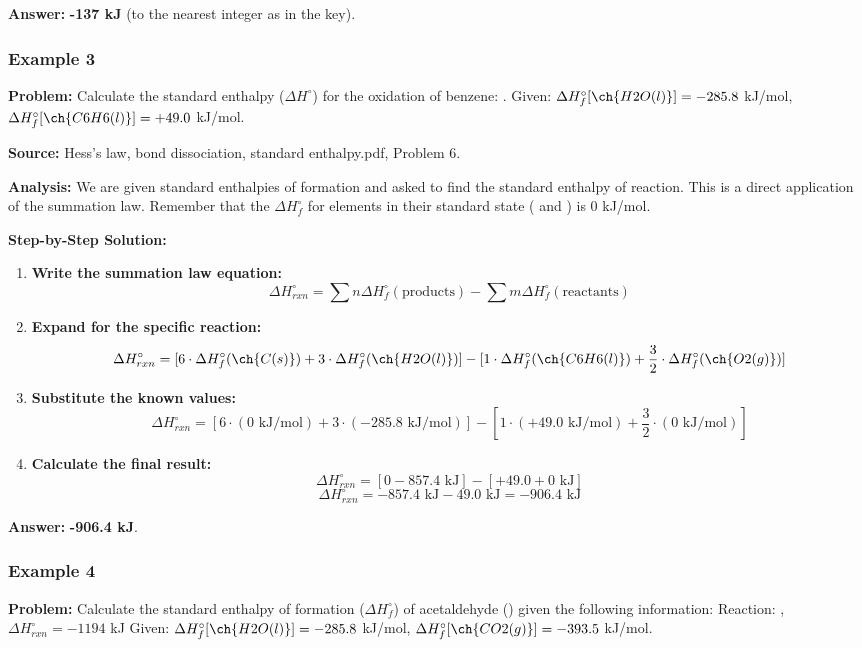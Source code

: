 \documentclass{article}
\begin{document}
\textbf{Answer:} \textbf{-137 kJ} (to the nearest integer as in the key).

\subsubsection{Example 3}
\textbf{Problem:} Calculate the standard enthalpy ($\Delta H^\circ$) for the oxidation of benzene: .
Given: $\Delta H_f^\circ[\ch{H2O(l)}] = -285.8$ kJ/mol, $\Delta H_f^\circ[\ch{C6H6(l)}] = +49.0$ kJ/mol.

\textbf{Source:} Hess's law, bond dissociation, standard enthalpy.pdf, Problem 6.

\textbf{Analysis:} We are given standard enthalpies of formation and asked to find the standard enthalpy of reaction. This is a direct application of the summation law. Remember that the $\Delta H_f^\circ$ for elements in their standard state ( and ) is 0 kJ/mol.

\textbf{Step-by-Step Solution:}
\begin{enumerate}
    \item \textbf{Write the summation law equation:}
    \[ \Delta H_{rxn}^\circ = \sum n\Delta H_f^\circ(\text{products}) - \sum m\Delta H_f^\circ(\text{reactants}) \]
    \item \textbf{Expand for the specific reaction:}
    \[ \Delta H_{rxn}^\circ = [6 \cdot \Delta H_f^\circ(\ch{C(s)}) + 3 \cdot \Delta H_f^\circ(\ch{H2O(l)})] - [1 \cdot \Delta H_f^\circ(\ch{C6H6(l)}) + \frac{3}{2} \cdot \Delta H_f^\circ(\ch{O2(g)})] \]
    \item \textbf{Substitute the known values:}
    \[ \Delta H_{rxn}^\circ = [6 \cdot (0 \text{ kJ/mol}) + 3 \cdot (-285.8 \text{ kJ/mol})] - [1 \cdot (+49.0 \text{ kJ/mol}) + \frac{3}{2} \cdot (0 \text{ kJ/mol})] \]
    \item \textbf{Calculate the final result:}
    \[ \Delta H_{rxn}^\circ = [0 - 857.4 \text{ kJ}] - [+49.0 + 0 \text{ kJ}] \]
    \[ \Delta H_{rxn}^\circ = -857.4 \text{ kJ} - 49.0 \text{ kJ} = -906.4 \text{ kJ} \]
\end{enumerate}

\textbf{Answer:} \textbf{-906.4 kJ}.

\subsubsection{Example 4}
\textbf{Problem:} Calculate the standard enthalpy of formation ($\Delta H_f^\circ$) of acetaldehyde () given the following information:
Reaction: , $\Delta H_{rxn}^\circ = -1194$ kJ
Given: $\Delta H_f^\circ[\ch{H2O(l)}] = -285.8$ kJ/mol, $\Delta H_f^\circ[\ch{CO2(g)}] = -393.5$ kJ/mol.
\end{document}
